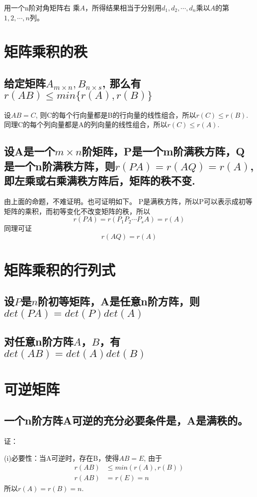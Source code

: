\documentclass[]{article}
\begin{document}
用一个n阶对角矩阵右
乘$ A $，所得结果相当于分别用$ d_1, d_2, \cdots, d_n $乘以$ A $的第$ 1,2,\cdots,n $列。

\section{矩阵乘积的秩}
\subsection{给定矩阵$ A_{m\times n}, B_{n\times s} $, 那么有$r(AB)\leq min\{r(A),r(B)\}$}
设$ AB=C $, 则C的每个行向量都是B的行向量的线性组合，所以$ r(C)\leq r(B) $. 同理C的每个列向量都是A的列向量的线性组合，所以$ r(C)\leq r(A) $.
\subsection{设A是一个$ m\times n $阶矩阵，P是一个m阶满秩方阵，Q是一个n阶满秩方阵，则$ r(PA)=r(AQ)=r(A)$, 即左乘或右乘满秩方阵后，矩阵的秩不变.}
由上面的命题，不难证明。也可证明如下。
P是满秩方阵，所以P可以表示成初等矩阵的乘积，而初等变化不改变矩阵的秩，所以
\[ 
r(PA) = r(P_1P_2\cdots P_sA) = r(A)
 \]
同理可证\[ r(AQ) = r(A) \]

\section{矩阵乘积的行列式}
\subsection{设$ P $是$ n $阶初等矩阵，A是任意n阶方阵，则$ det(PA)=det(P)det(A) $}
\subsection{对任意n阶方阵$ A $，$ B $，有$ det(AB)=det(A)det(B) $}

\section{可逆矩阵}
\subsection{一个n阶方阵A可逆的充分必要条件是，A是满秩的。}
证：

(i)必要性：当A可逆时，存在B，使得$ AB=E $, 由于
\[
\begin{aligned}
r(AB) &\leq min(r(A), r(B)) \\
r(AB) &= r(E) = n 
\end{aligned}
\]
所以$ r(A) = r(B) = n $.
\end{document}
